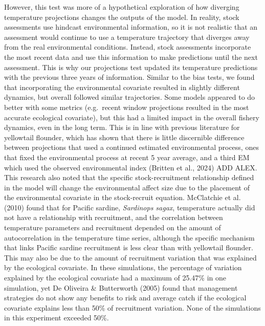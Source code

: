 \documentclass[
  12pt,
]{article}
\begin{document}
However, this test was more of a hypothetical exploration of how diverging temperature projections changes the outputs of the model. In reality, stock assessments use hindcast environmental information, so it is not realistic that an assessment would continue to use a temperature trajectory that diverges away from the real environmental conditions. Instead, stock assessments incorporate the most recent data and use this information to make predictions until the next assessment. This is why our projections test updated its temperature predictions with the previous three years of information. Similar to the bias tests, we found that incorporating the environmental covariate resulted in slightly different dynamics, but overall followed similar trajectories. Some models appeared to do better with some metrics (e.g.~recent window projections resulted in the most accurate ecological covariate), but this had a limited impact in the overall fishery dynamics, even in the long term. This is in line with previous literature for yellowtail flounder, which has shown that there is little discernible difference between projections that used a continued estimated environmental process, ones that fixed the environmental process at recent 5 year average, and a third EM which used the observed environmental index (Britten et al., 2024) ADD ALEX. This research also noted that the specific stock-recruitment relationship defined in the model will change the environmental affect size due to the placement of the environmental covariate in the stock-recruit equation. McClatchie et al. (2010) found that for Pacific sardine, \emph{Sardinops sagax}, temperature actually did not have a relationship with recruitment, and the correlation between temperature parameters and recruitment depended on the amount of autocorrelation in the temperature time series, although the specific mechanism that links Pacific sardine recruitment is less clear than with yellowtail flounder. This may also be due to the amount of recruitment variation that was explained by the ecological covariate. In these simulations, the percentage of variation explained by the ecological covariate had a maximum of 25.47\% in one simulation, yet De Oliveira \& Butterworth (2005) found that management strategies do not show any benefits to risk and average catch if the ecological covariate explains less than 50\% of recruitment variation. None of the simulations in this experiment exceeded 50\%.
\end{document}
